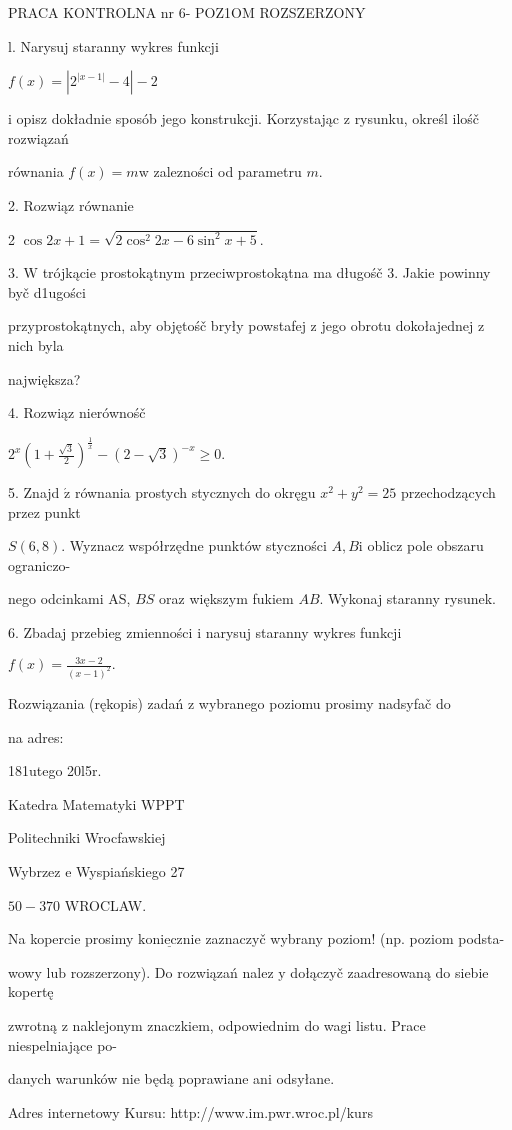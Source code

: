 \documentclass[a4paper,12pt]{article}
\begin{document}
PRACA KONTROLNA nr 6- POZ1OM ROZSZERZONY

l. Narysuj staranny wykres funkcji

$f(x)=|2^{|x-1|}-4|-2$

$\mathrm{i}$ opisz dokładnie sposób jego konstrukcji. Korzystając $\mathrm{z}$ rysunku, określ ilośč rozwiązań

równania $f(x)=m\mathrm{w}$ zalezności od parametru $m.$

2. Rozwiąz równanie

2 $\cos 2x+1=\sqrt{2\cos^{2}2x-6\sin^{2}x+5}.$

3. $\mathrm{W}$ trójkącie prostokątnym przeciwprostokątna ma długośč 3. Jakie powinny byč d1ugości

przyprostokątnych, aby objętośč bryły powstafej $\mathrm{z}$ jego obrotu dokołajednej $\mathrm{z}$ nich byla

największa?

4. Rozwiąz nierównośč

$2^{x}(1+\displaystyle \frac{\sqrt{3}}{2})^{\frac{1}{x}}-(2-\sqrt{3})^{-x}\geq 0.$

5. Znajd $\acute{\mathrm{z}}$ równania prostych stycznych do okręgu $x^{2}+y^{2}=25$ przechodzących przez punkt

$S(6,8)$. Wyznacz współrzędne punktów styczności $A, B\mathrm{i}$ oblicz pole obszaru ograniczo-

nego odcinkami AS, $BS$ oraz większym fukiem $AB$. Wykonaj staranny rysunek.

6. Zbadaj przebieg zmienności $\mathrm{i}$ narysuj staranny wykres funkcji

$f(x)=\displaystyle \frac{3x-2}{(x-1)^{2}}.$

Rozwiązania (rękopis) zadań z wybranego poziomu prosimy nadsyfač do

na adres:

181utego 20l5r.

Katedra Matematyki WPPT

Politechniki Wrocfawskiej

Wybrzez $\mathrm{e}$ Wyspiańskiego 27

$50-370$ WROCLAW.

Na kopercie prosimy $\underline{\mathrm{k}\mathrm{o}\mathrm{n}\mathrm{i}\mathrm{e}\mathrm{c}\mathrm{z}\mathrm{n}\mathrm{i}\mathrm{e}}$ zaznaczyč wybrany poziom! (np. poziom podsta-

wowy $\mathrm{l}\mathrm{u}\mathrm{b}$ rozszerzony). Do rozwiązań nalez $\mathrm{y}$ dołączyč zaadresowaną do siebie kopertę

zwrotną $\mathrm{z}$ naklejonym znaczkiem, odpowiednim do wagi listu. Prace niespelniające po-

danych warunków nie będą poprawiane ani odsyłane.

Adres internetowy Kursu: http://www.im.pwr.wroc.pl/kurs
\end{document}
